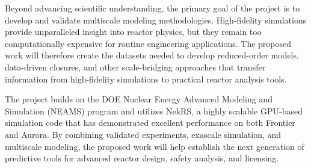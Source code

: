 \documentclass[11pt,letterpaper,english]{article}
\begin{document}
Beyond advancing scientific understanding, the primary goal of the project is to develop and validate multiscale modeling methodologies. High-fidelity simulations provide unparalleled insight into reactor physics, but they remain too computationally expensive for routine engineering applications. The proposed work will therefore create the datasets needed to develop reduced-order models, data-driven closures, and other scale-bridging approaches that transfer information from high-fidelity simulations to practical reactor analysis tools.

The project builds on the DOE Nuclear Energy Advanced Modeling and Simulation (NEAMS) program and utilizes NekRS, a highly scalable GPU-based simulation code that has demonstrated excellent performance on both Frontier and Aurora. By combining validated experiments, exascale simulation, and multiscale modeling, the proposed work will help establish the next generation of predictive tools for advanced reactor design, safety analysis, and licensing.
\end{document}
